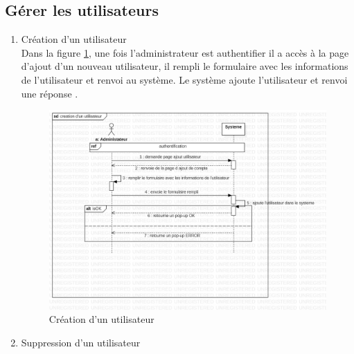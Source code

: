 \documentclass[11pt,a4paper]{report}
\begin{document}
 \subsection{Gérer les utilisateurs}
 \begin{enumerate}
 \item Création d'un utilisateur \\ 
 
 Dans la figure \ref{fig:diagram3}, une fois l'administrateur est authentifier il a accès à la page d'ajout d'un nouveau utilisateur, il rempli le formulaire avec les informations de l'utilisateur et renvoi au système. Le système ajoute l'utilisateur et renvoi une réponse . 
 \begin{center}
 \begin{figure}[H]
 \includegraphics[width=\linewidth]{img/jpg/safeprivacing1.jpg}
 \caption{Création d'un utilisateur}
 \label{fig:diagram3}
 \end{figure}
 \end{center}
\newpage
 \item Suppression d'un utilisateur \\
 

\end{enumerate}
\end{document}
